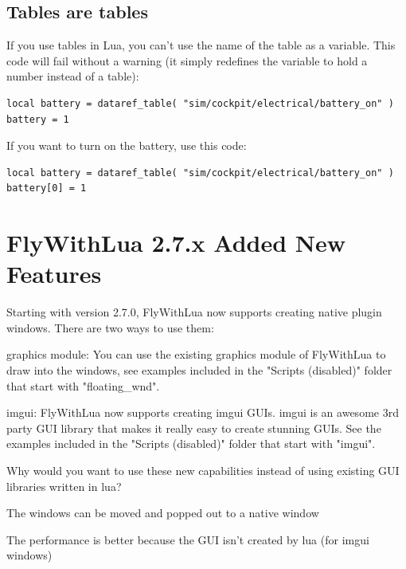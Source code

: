 \documentclass[11pt,parskip=half,a4paper]{scrartcl}
\begin{document}
\subsection{Tables are tables}

If you use tables in Lua, you can't use the name of the table as a variable. This code will fail without a warning (it simply redefines the variable to hold a number instead of a table):

\begin{lstlisting}
local battery = dataref_table( "sim/cockpit/electrical/battery_on" )
battery = 1
\end{lstlisting}

If you want to turn on the battery, use this code:

\begin{lstlisting}
local battery = dataref_table( "sim/cockpit/electrical/battery_on" )
battery[0] = 1
\end{lstlisting}

\newpage
\section{FlyWithLua 2.7.x Added New Features}

Starting with version 2.7.0, FlyWithLua now supports creating native plugin windows. There are two ways to use them:

\hspace*{10mm}	graphics module: You can use the existing graphics module of FlyWithLua to draw into 
\hspace*{10mm}	the windows, see examples included in the "Scripts (disabled)" folder that start with
\hspace*{10mm}	"floating\_wnd".

\hspace*{10mm}	imgui: FlyWithLua now supports creating imgui GUIs. imgui is an awesome 3rd party
\hspace*{10mm}	GUI library that makes it really easy to create stunning GUIs. See the examples included
\hspace*{10mm}	in the "Scripts (disabled)" folder that start with "imgui".

Why would you want to use these new capabilities instead of using existing GUI libraries written in
lua?

\hspace*{10mm}	The windows can be moved and popped out to a native window

\hspace*{10mm}	The performance is better because the GUI isn't created by lua (for imgui windows)
\end{document}
